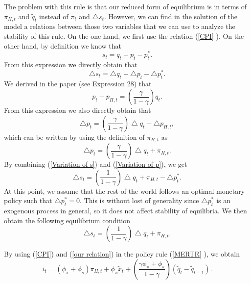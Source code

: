 \documentclass{article}
\begin{document}
The problem with this rule is that our reduced form of equilibrium is in
terms of $\pi _{H,t}$ and $\widetilde{q}_{t}$ instead of $\pi _{t}$ and $%
\bigtriangleup s_{t}.$ However, we can find in the solution of the model a
relations between those two variables that we can use to analyze the
stability of this rule. On the one hand, we first use the relation (\ref{CPI}%
). On the other hand, by definition we know that%
\begin{equation*}
s_{t}=q_{t}+p_{t}-p_{t}^{\ast }.
\end{equation*}%
From this expression we directly obtain that%
\begin{equation}
\bigtriangleup s_{t}=\bigtriangleup q_{t}+\bigtriangleup
p_{t}-\bigtriangleup p_{t}^{\ast }.  \label{Variation of s}
\end{equation}%
We derived in the paper (see Expression 28) that%
\begin{equation*}
p_{t}-p_{H,t}=\left( \frac{\gamma }{1-\gamma }\right) q_{t}.
\end{equation*}%
From this expression we also directly obtain that%
\begin{equation*}
\bigtriangleup p_{t}=\left( \frac{\gamma }{1-\gamma }\right) \bigtriangleup
q_{t}+\bigtriangleup p_{H,t},
\end{equation*}%
which can be written by using the definition of $\pi _{H,t}$ as%
\begin{equation}
\bigtriangleup p_{t}=\left( \frac{\gamma }{1-\gamma }\right) \bigtriangleup
q_{t}+\pi _{H,t}.  \label{Variation of p}
\end{equation}%
By combining (\ref{Variation of s}) and (\ref{Variation of p}), we get%
\begin{equation}
\bigtriangleup s_{t}=\left( \frac{1}{1-\gamma }\right) \bigtriangleup
q_{t}+\pi _{H,t}-\bigtriangleup p_{t}^{\ast }.  \label{Variation of s bis}
\end{equation}%
At this point, we assume that the rest of the world follows an optimal
monetary policy such that $\bigtriangleup p_{t}^{\ast }=0.$ This is without
lost of generality since $\bigtriangleup p_{t}^{\ast }$ is an exogenous
process in general, so it does not affect stability of equilibria. We then
obtain the following equilibrium condition%
\begin{equation}
\bigtriangleup s_{t}=\left( \frac{1}{1-\gamma }\right) \bigtriangleup
q_{t}+\pi _{H,t}.  \label{our relation}
\end{equation}

By using (\ref{CPI}) and (\ref{our relation}) in the policy rule (\ref{MERTR}%
), we obtain%
\begin{equation}
i_{t}=\left( \phi _{\pi }+\phi _{s}\right) \pi _{H,t}+\phi _{x}\widetilde{x}%
_{t}+\left( \frac{\gamma \phi _{\pi }+\phi _{s}}{1-\gamma }\right) \left( 
\widetilde{q}_{t}-\widetilde{q}_{t-1}\right) .  \label{DIMERTR}
\end{equation}
\end{document}
